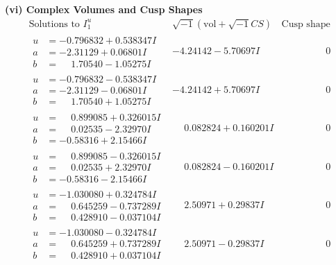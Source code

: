 \documentclass[1p]{elsarticle_modified}
\theoremstyle{definition}
\newcommand{\I}{\sqrt{-1}}
\begin{document}
\newpage\flushleft \textbf{(vi) Complex Volumes and Cusp Shapes}
$$\begin{array}{c|c|c}  
\text{Solutions to }I^u_{1}& \I (\text{vol} + \sqrt{-1}CS) & \text{Cusp shape}\\
 \hline 
\begin{aligned}
u &= -0.796832 + 0.538347 I \\
a &= -2.31129 + 0.06801 I \\
b &= \phantom{-}1.70540 - 1.05275 I\end{aligned}
 & -4.24142 - 5.70697 I & \phantom{-0.000000 } 0 \\ \hline\begin{aligned}
u &= -0.796832 - 0.538347 I \\
a &= -2.31129 - 0.06801 I \\
b &= \phantom{-}1.70540 + 1.05275 I\end{aligned}
 & -4.24142 + 5.70697 I & \phantom{-0.000000 } 0 \\ \hline\begin{aligned}
u &= \phantom{-}0.899085 + 0.326015 I \\
a &= \phantom{-}0.02535 - 2.32970 I \\
b &= -0.58316 + 2.15466 I\end{aligned}
 & \phantom{-}0.082824 + 0.160201 I & \phantom{-0.000000 } 0 \\ \hline\begin{aligned}
u &= \phantom{-}0.899085 - 0.326015 I \\
a &= \phantom{-}0.02535 + 2.32970 I \\
b &= -0.58316 - 2.15466 I\end{aligned}
 & \phantom{-}0.082824 - 0.160201 I & \phantom{-0.000000 } 0 \\ \hline\begin{aligned}
u &= -1.030080 + 0.324784 I \\
a &= \phantom{-}0.645259 - 0.737289 I \\
b &= \phantom{-}0.428910 - 0.037104 I\end{aligned}
 & \phantom{-}2.50971 + 0.29837 I & \phantom{-0.000000 } 0 \\ \hline\begin{aligned}
u &= -1.030080 - 0.324784 I \\
a &= \phantom{-}0.645259 + 0.737289 I \\
b &= \phantom{-}0.428910 + 0.037104 I\end{aligned}
 & \phantom{-}2.50971 - 0.29837 I & \phantom{-0.000000 } 0 \\ \hline\begin{aligned}

\end{aligned}
\end{array}$$
\end{document}
